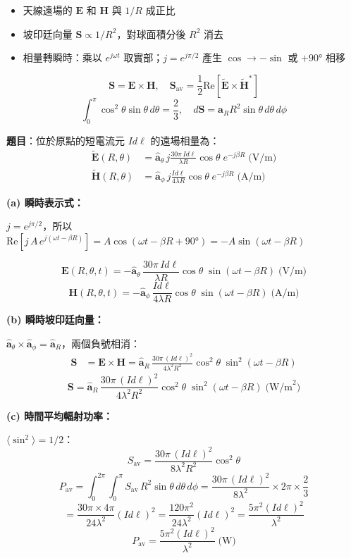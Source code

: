 \documentclass[12pt,a4paper]{article}
\newcommand{\vE}{\mathbf{E}}
\newcommand{\vH}{\mathbf{H}}
\newcommand{\vS}{\mathbf{S}}
\newcommand{\aR}{\hat{\mathbf{a}}_R}
\newcommand{\ath}{\hat{\mathbf{a}}_\theta}
\newcommand{\aph}{\hat{\mathbf{a}}_\phi}
\begin{document}
\begin{conceptbox}[核心概念]
\begin{itemize}
  \item 天線遠場的 $\vE$ 和 $\vH$ 與 $1/R$ 成正比
  \item 坡印廷向量 $\vS \propto 1/R^2$，對球面積分後 $R^2$ 消去
  \item 相量轉瞬時：乘以 $e^{j\omega t}$ 取實部；$j = e^{j\pi/2}$ 產生 $\cos\to -\sin$ 或 $+90°$ 相移
\end{itemize}
\end{conceptbox}

\begin{formulabox}[相關公式]
\[
  \vS = \vE\times\vH, \quad \vS_{\text{av}} = \frac{1}{2}\text{Re}[\tilde{\vE}\times\tilde{\vH}^*]
\]
\[
  \int_0^\pi \cos^2\theta\sin\theta\,d\theta = \frac{2}{3}, \quad
  d\vS = \aR R^2\sin\theta\,d\theta\,d\phi
\]
\end{formulabox}

\textbf{題目}：位於原點的短電流元 $Id\ell$ 的遠場相量為：
\begin{align*}
  \tilde{\vE}(R,\theta) &= \ath\,j\frac{30\pi\,Id\ell}{\lambda R}\cos\theta\;e^{-j\beta R} \;\text{(V/m)} \\[4pt]
  \tilde{\vH}(R,\theta) &= \aph\,j\frac{Id\ell}{4\lambda R}\cos\theta\;e^{-j\beta R} \;\text{(A/m)}
\end{align*}

\begin{solutionbox}[詳解]

\textbf{(a) 瞬時表示式：}

$j = e^{j\pi/2}$，所以 $\text{Re}[j\,A\,e^{j(\omega t - \beta R)}] = A\cos(\omega t - \beta R + 90°) = -A\sin(\omega t - \beta R)$

\[
  \boxed{\vE(R,\theta,t) = -\ath\,\frac{30\pi\,Id\ell}{\lambda R}\cos\theta\;\sin(\omega t - \beta R) \;\text{(V/m)}}
\]
\[
  \boxed{\vH(R,\theta,t) = -\aph\,\frac{Id\ell}{4\lambda R}\cos\theta\;\sin(\omega t - \beta R) \;\text{(A/m)}}
\]

\textbf{(b) 瞬時坡印廷向量：}

$\ath\times\aph = \aR$，兩個負號相消：
\begin{align*}
  \vS &= \vE\times\vH = \aR\,\frac{30\pi\,(Id\ell)^2}{4\lambda^2 R^2}\cos^2\theta\;\sin^2(\omega t - \beta R)
\end{align*}
\[
  \boxed{\vS = \aR\,\frac{30\pi\,(Id\ell)^2}{4\lambda^2 R^2}\cos^2\theta\;\sin^2(\omega t - \beta R) \;\text{(W/m}^2\text{)}}
\]

\textbf{(c) 時間平均輻射功率：}

$\langle\sin^2\rangle = 1/2$：
\[
  S_{\text{av}} = \frac{30\pi\,(Id\ell)^2}{8\lambda^2 R^2}\cos^2\theta
\]
\[
  P_{\text{av}} = \int_0^{2\pi}\!\int_0^\pi S_{\text{av}}\,R^2\sin\theta\,d\theta\,d\phi
  = \frac{30\pi\,(Id\ell)^2}{8\lambda^2}\times 2\pi\times\frac{2}{3}
\]
\[
  = \frac{30\pi\times 4\pi}{24\lambda^2}(Id\ell)^2
  = \frac{120\pi^2}{24\lambda^2}(Id\ell)^2
  = \frac{5\pi^2(Id\ell)^2}{\lambda^2}
\]
\[
  \boxed{P_{\text{av}} = \frac{5\pi^2(Id\ell)^2}{\lambda^2} \;\text{(W)}}
\]
\end{solutionbox}
\end{document}
